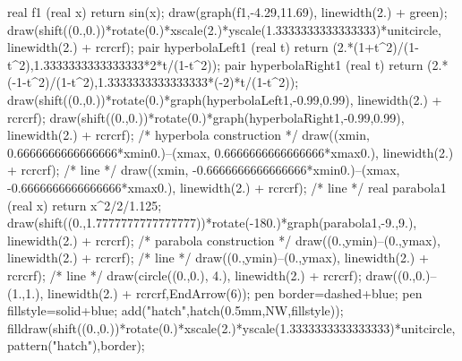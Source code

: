 real f1 (real x) {return sin(x);} 
draw(graph(f1,-4.29,11.69), linewidth(2.) + green); draw(shift((0.,0.))*rotate(0.)*xscale(2.)*yscale(1.3333333333333333)*unitcircle, linewidth(2.) + rcrcrf); 
pair hyperbolaLeft1 (real t) {return (2.*(1+t^2)/(1-t^2),1.3333333333333333*2*t/(1-t^2));} pair hyperbolaRight1 (real t) {return (2.*(-1-t^2)/(1-t^2),1.3333333333333333*(-2)*t/(1-t^2));} 
draw(shift((0.,0.))*rotate(0.)*graph(hyperbolaLeft1,-0.99,0.99), linewidth(2.) + rcrcrf); draw(shift((0.,0.))*rotate(0.)*graph(hyperbolaRight1,-0.99,0.99), linewidth(2.) + rcrcrf); /* hyperbola construction */
draw((xmin, 0.6666666666666666*xmin0.)--(xmax, 0.6666666666666666*xmax0.), linewidth(2.) + rcrcrf); /* line */
draw((xmin, -0.6666666666666666*xmin0.)--(xmax, -0.6666666666666666*xmax0.), linewidth(2.) + rcrcrf); /* line */
real parabola1 (real x) {return x^2/2/1.125;} 
draw(shift((0.,1.7777777777777777))*rotate(-180.)*graph(parabola1,-9.,9.), linewidth(2.) + rcrcrf); /* parabola construction */
draw((0.,ymin)--(0.,ymax), linewidth(2.) + rcrcrf); /* line */
draw((0.,ymin)--(0.,ymax), linewidth(2.) + rcrcrf); /* line */
draw(circle((0.,0.), 4.), linewidth(2.) + rcrcrf); 
draw((0.,0.)--(1.,1.), linewidth(2.) + rcrcrf,EndArrow(6)); 
pen border=dashed+blue;
pen fillstyle=solid+blue;
add("hatch",hatch(0.5mm,NW,fillstyle));
filldraw(shift((0.,0.))*rotate(0.)*xscale(2.)*yscale(1.3333333333333333)*unitcircle,pattern("hatch"),border);

